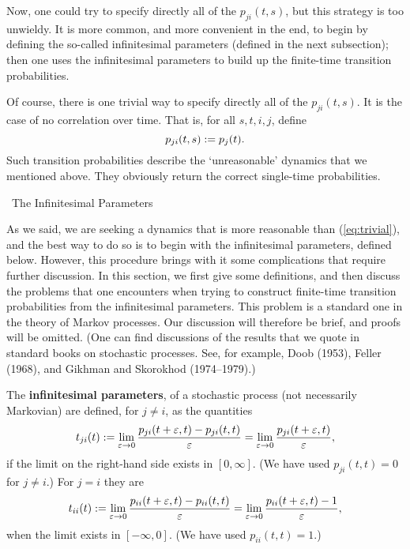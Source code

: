 \documentclass[12pt]{article}
\newcommand{\be}{\vspace*{6pt} \begin{equation}}
\newcommand{\ee}{\vspace*{10pt} \end{equation}}
\renewcommand{\subsection}[1]{\addtocounter{subsection}{1}
                           \setcounter{subsubsection}{0}
                           \vspace{20pt}
                           \begin{center}
                           \thesubsection \ #1
                           \end{center}
                           \vspace{20pt}}
\renewcommand{\epsilon}{\varepsilon}
\begin{document}
Now, one could try to specify directly all of the $p_{ji}(t,s)$,
but this strategy is too unwieldy.  It is more common, and more
convenient in the end, to begin by defining the so-called
infinitesimal parameters (defined in the next subsection); then one uses
the infinitesimal parameters to build up the finite-time transition
probabilities.

Of course, there is one trivial way to specify directly all of the
$p_{ji}(t,s)$.  It is the case of no correlation over time.  That is,
for all $s,t,i,j$, define
\be
\label{eq:trivial}
p_{ji}(t,s) := p_{j}(t).
\ee
Such transition probabilities describe the `unreasonable' dynamics
that we mentioned above.  They obviously return the correct
single-time probabilities.


\subsection{The Infinitesimal Parameters}


As we said, we are seeking a dynamics that is more reasonable than
(\ref{eq:trivial}), and the best way to do so is to begin with the
infinitesimal parameters, defined below.  However, this procedure
brings with it some complications that require further discussion.  In
this section, we first give some definitions, and then discuss the
problems that one encounters when trying to construct finite-time
transition probabilities from the infinitesimal parameters.  This
problem is a standard one in the theory of Markov processes.  Our
discussion will therefore be brief, and proofs will be omitted.  (One
can find discussions of the results that we quote in standard books on
stochastic processes.  See, for example, Doob (1953), Feller (1968), 
and Gikhman and Skorokhod (1974--1979).)

The {\bf infinitesimal parameters}, of a stochastic process (not
necessarily Markovian) are defined, for $j\neq i$, as the quantities
\be
\label{eq:inf1}
t_{ji}(t):=\lim_{\epsilon\rightarrow 0}
\frac{p_{ji}(t+\epsilon,t) - p_{ji}(t,t)}{\epsilon} =
\lim_{\epsilon\rightarrow 0}
\frac{p_{ji}(t+\epsilon,t)}{\epsilon},
\ee
if the limit on the right-hand side exists in $[0,\infty]$.  (We have
used $p_{ji}(t,t) = 0$ for $j \neq i$.) For $j=i$ they are
\be
\label{eq:inf2}
t_{ii}(t):= \lim_{\epsilon\rightarrow 0}\frac{p_{ii}(t+\epsilon,t) -
p_{ii}(t,t)}{\epsilon} = \lim_{\epsilon\rightarrow
0}\frac{p_{ii}(t+\epsilon,t)-1}{\epsilon},
\ee
when the limit exists in $[-\infty,0]$.  (We have used $p_{ii}(t,t) =
1$.)
\end{document}
